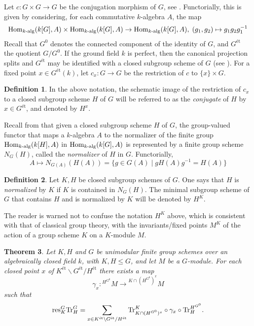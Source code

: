 \documentclass[12pt]{amsart}
\newtheorem{theorem}{Theorem}[subsection]
\theoremstyle{definition}
\newtheorem{definition}[theorem]{Definition}
\begin{document}
Let $c \colon G\times G\rightarrow G$ be the conjugation morphism of $G$, see \cite[I.2.4(7)]{MR2015057}. Functorially, this is given by considering, for each commutative $k$-algebra $A$, the map
\[
{\rm Hom}_{k\text{-alg}}(k[G],A)\times {\rm Hom}_{k\text{-alg}}(k[G],A)
\rightarrow
{\rm Hom}_{k\text{-alg}}(k[G],A),\;
(g_1,g_2)\mapsto g_1g_2g_1^{-1}
\]
Recall that $G^0$ denotes the connected component of the identity of $G$, and $G^{\text{\'et}}$ the quotient $G/G^0$. If the ground field $k$ is perfect, then the canonical projection splits and $G^{\text{\'et}}$ may be identified with a closed subgroup scheme of $G$ (see \cite[6.8]{MR547117}). For a fixed point $x\in G^{\text{\'et}}(k)$, let $c_x \colon G\rightarrow G$ be the restriction of $c$ to $\{x\}\times G$.
\begin{definition} In the above notation, the schematic image of the restriction of $c_x$ to a closed subgroup scheme $H$ of $G$ will be referred to as the {\em conjugate} of $H$ by $x\in G^{\text{\'et}}$, and denoted by $H^x$.
\end{definition}
Recall from  \cite[I.2.6]{MR2015057} that given a closed subgroup scheme $H$ of $G$, the group-valued functor that maps a $k$-algebra $A$ to the normalizer of the finite group ${\rm Hom}_{k\text{-alg}}(k[H],A)$ in  ${\rm Hom}_{k\text{-alg}}(k[G],A)$ is represented by a finite group scheme $N_G(H)$, called the {\em normalizer} of $H$ in $G$. Functorially,
$$A \mapsto N_{G(A)}(H(A)) = \{ g \in G(A) \mid g H(A) g^{-1} = H(A) \}$$

\begin{definition} 
	Let $K,H$ be closed subgroup schemes of $G$. One says that $H$ is {\em normalized} by $K$ if $K$ is contained in $N_G(H)$. The minimal subgroup scheme of $G$ that contains $H$ and is normalized by $K$ will be denoted by $H^K$.
\end{definition}

 The reader is warned not to confuse the notation $H^K$ above, which is consistent with that of classical group theory, with the invariants/fixed points $M^K$ of the action of a group scheme $K$ on a $K$-module $M$.

\begin{theorem}\label{th:Mackey}
	Let $K,H$ and $G$ be unimodular finite group schemes over an algebraically closed field $k$, with $K,H\leq G$, and let $M$ be a $G$-module. For each closed point $x$ of $K^{\text{\'et}} \backslash G^{\text{\'et}} / H^{\text{\'et}}$ there exists a map
	\[
	\gamma_x \colon
	{}^{H^{G^0}} \! \! M \rightarrow {}^{K\cap (H^{G^0})^x} \! M
	\]
	such that 
	\[
	{\rm res}_K^G{\rm Tr}_H^G
	=
	\sum_{x\in K^{\text{\'et}} \backslash G^{\text{\'et}} / H^{\text{\'et}}}
	{\rm Tr}_{K\cap (H^{G^0})^x}^K\circ \gamma_x\circ {\rm Tr}_H^{H^{G^0}}.
	\]
\end{theorem}
\end{document}
